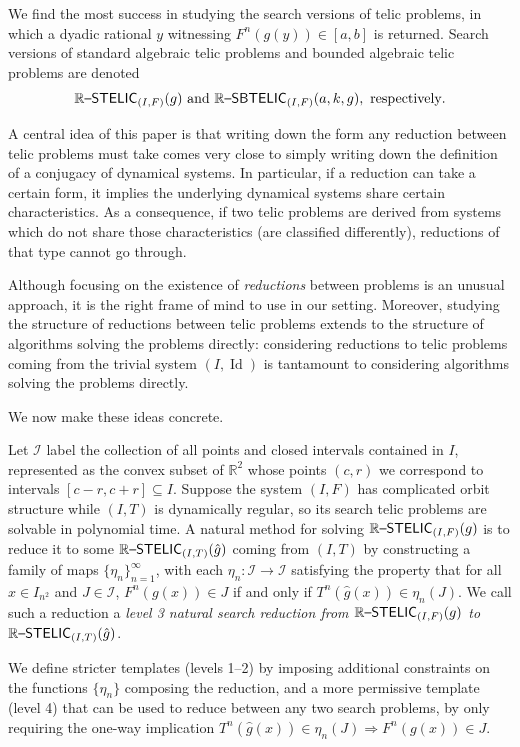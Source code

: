 \documentclass{amsart}
\theoremstyle{theorem}
\theoremstyle{remark}
\DeclareMathOperator{\Id}{Id}
\newcommand{\RR}{\mathbb{R}}
\newcommand{\ccRSTELIC}{\mathbb{R}\textsf{\upshape --STELIC}}
\newcommand{\ccRSBTELIC}{\mathbb{R}\textsf{\upshape --SBTELIC}}
\newcommand{\cI}{\mathcal{I}}
\begin{document}
We find the most success in studying the search versions of telic problems, in which a dyadic rational $y$ witnessing $F^n(g(y)) \in [a, b]$ is returned. Search versions of standard algebraic telic problems and bounded algebraic telic problems are denoted
\[
\ccRSTELIC_{(I, F)}(g) \text{ and } \ccRSBTELIC_{(I, F)}(a,k,g),\text{ respectively}.
\]

A central idea of this paper is that writing down the form any reduction between telic problems must take comes very close to simply writing down the definition of a conjugacy of dynamical systems.
In particular, if a reduction can take a certain form, it implies the underlying dynamical systems share certain characteristics. 
As a consequence, if two telic problems are derived from systems which do not share those characteristics (are classified differently), reductions of that type cannot go through.

Although focusing on the existence of \emph{reductions} between problems is an unusual approach, it is the right frame of mind to use in our setting. Moreover, studying the structure of reductions between telic problems extends to the structure of algorithms solving the problems directly: considering reductions to telic problems coming from the trivial system $(I, \Id)$ is tantamount to considering algorithms solving the problems directly.

We now make these ideas concrete.

Let $\cI$ label the collection of all points and closed intervals contained in $I$, represented as the convex subset of $\RR^2$ whose points $(c,r)$ we correspond to intervals $[c-r,c+r]\subseteq I$.
Suppose the system $(I, F)$ has complicated orbit structure while $(I, T)$ is dynamically regular, so its search telic problems are solvable in polynomial time.
A natural method for solving $\ccRSTELIC_{(I, F)}(g)$ is to reduce it to some $\ccRSTELIC_{(I, T)}(\hat{g})$ coming from $(I, T)$ by constructing a family of maps $\{\eta_n\}_{n=1}^\infty$, with each $\eta_n:\cI \rightarrow \cI$ satisfying the property that for all $x \in I_{n^2}$ and $J \in \cI$, $F^n(g(x)) \in J$ if and only if $T^n(\hat{g}(x)) \in \eta_n(J)$.
We call such a reduction a \emph{level 3 natural search reduction from $\ccRSTELIC_{(I, F)}(g)$ to $\ccRSTELIC_{(I, T)}(\hat{g})$}.

We define stricter templates (levels 1--2) by imposing additional constraints on the functions $\{\eta_n\}$ composing the reduction,
and a more permissive template (level 4) that can be used to reduce between any two search problems, by only requiring the one-way implication
$T^n(\hat g(x))\in \eta_n(J)\Rightarrow F^n(g(x))\in J$.
\end{document}
